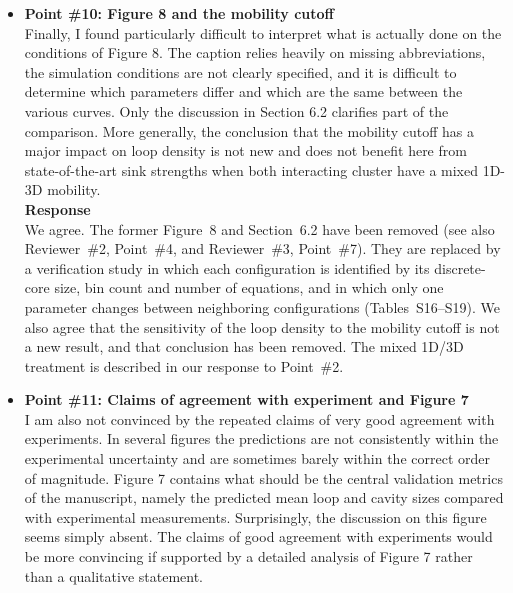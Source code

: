 \documentclass{article}
\begin{document}
\begin{itemize}
\textbf{Response}\\
We agree, and the claim has been removed. The revised manuscript assesses the reductions by their accuracy against the exact discrete solution (Section~4.4 and Supplementary Section~S6). It assesses the model by the six-observable comparison and the loop-character analysis (Sections~4.1--4.2), and it states the limitations of both.

\item \textbf{Point \#10: Figure 8 and the mobility cutoff}\\
Finally, I found particularly difficult to interpret what is actually done on the conditions of Figure 8. The caption relies heavily on missing abbreviations, the simulation conditions are not clearly specified, and it is difficult to determine which parameters differ and which are the same between the various curves. Only the discussion in Section 6.2 clarifies part of the comparison. More generally, the conclusion that the mobility cutoff has a major impact on loop density is not new and does not benefit here from state-of-the-art sink strengths when both interacting cluster have a mixed 1D-3D mobility.\\

\textbf{Response}\\
We agree. The former Figure~8 and Section~6.2 have been removed (see also Reviewer~\#2, Point~\#4, and Reviewer~\#3, Point~\#7). They are replaced by a verification study in which each configuration is identified by its discrete-core size, bin count and number of equations, and in which only one parameter changes between neighboring configurations (Tables~S16--S19). We also agree that the sensitivity of the loop density to the mobility cutoff is not a new result, and that conclusion has been removed. The mixed 1D/3D treatment is described in our response to Point~\#2.

\item \textbf{Point \#11: Claims of agreement with experiment and Figure 7}\\
I am also not convinced by the repeated claims of very good agreement with experiments. In several figures the predictions are not consistently within the experimental uncertainty and are sometimes barely within the correct order of magnitude. Figure 7 contains what should be the central validation metrics of the manuscript, namely the predicted mean loop and cavity sizes compared with experimental measurements. Surprisingly, the discussion on this figure seems simply absent. The claims of good agreement with experiments would be more convincing if supported by a detailed analysis of Figure 7 rather than a qualitative statement.\\


\end{itemize}
\end{document}
